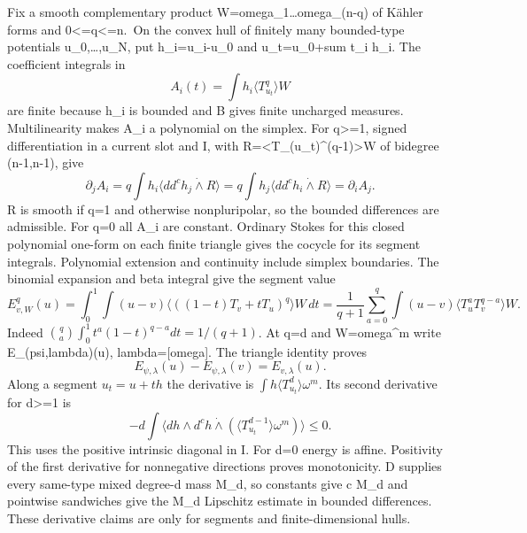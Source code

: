 \documentclass[
]{article}
\begin{document}
Fix a smooth complementary product W=omega\_1\ldots omega\_(n-q) of
Kähler forms and 0\textless=q\textless=n.~On the convex hull of finitely
many bounded-type potentials u\_0,\ldots,u\_N, put h\_i=u\_i-u\_0 and
u\_t=u\_0+sum t\_i h\_i. The coefficient integrals in \[
A_i(t)=\int h_i\langle T_{u_t}^q\rangle W
\] are finite because h\_i is bounded and B gives finite uncharged
measures. Multilinearity makes A\_i a polynomial on the simplex. For
q\textgreater=1, signed differentiation in a current slot and I, with
R=\textless T\_(u\_t)\^{}(q-1)\textgreater W of bidegree (n-1,n-1), give
\[
\partial_j A_i=q\int h_i\langle dd^ch_j\mathbin{\dot\wedge}R\rangle
=q\int h_j\langle dd^ch_i\mathbin{\dot\wedge}R\rangle
=\partial_i A_j.
\] R is smooth if q=1 and otherwise nonpluripolar, so the bounded
differences are admissible. For q=0 all A\_i are constant. Ordinary
Stokes for this closed polynomial one-form on each finite triangle gives
the cocycle for its segment integrals. Polynomial extension and
continuity include simplex boundaries. The binomial expansion and beta
integral give the segment value \[
E^q_{v,W}(u)=\int_0^1\int(u-v)
\langle((1-t)T_v+tT_u)^q\rangle W\,dt
=\frac1{q+1}\sum_{a=0}^q\int(u-v)\langle T_u^aT_v^{q-a}\rangle W.\tag{1}
\] Indeed \(\binom qa\int_0^1 t^a(1-t)^{q-a}dt=1/(q+1)\). At q=d and
W=omega\^{}m write E\_(psi,lambda)(u), lambda={[}omega{]}. The triangle
identity proves \[
E_{\psi,\lambda}(u)-E_{\psi,\lambda}(v)=E_{v,\lambda}(u).\tag{2}
\] Along a segment \(u_t=u+t h\) the derivative is
\(\int h\langle T_{u_t}^d\rangle\omega^m\). Its second derivative for
d\textgreater=1 is \[
-d\int\langle dh\wedge d^ch\mathbin{\dot\wedge}
(\langle T_{u_t}^{d-1}\rangle\omega^m)\rangle\leq0.
\] This uses the positive intrinsic diagonal in I. For d=0 energy is
affine. Positivity of the first derivative for nonnegative directions
proves monotonicity. D supplies every same-type mixed degree-d mass
M\_d, so constants give c M\_d and pointwise sandwiches give the M\_d
Lipschitz estimate in bounded differences. These derivative claims are
only for segments and finite-dimensional hulls.
\end{document}
